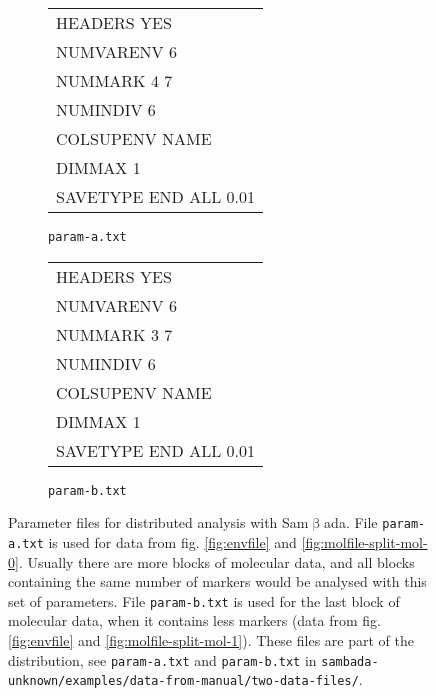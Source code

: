 \documentclass[a4paper,11pt]{article}
\newcommand{\versionnumber}{unknown}
\newcommand{\smb}{\textsf{Sam$\upbeta$ada}}
\newcommand{\pathtodatafrommanual}{\texttt{sambada-\versionnumber/examples/data-from-manual/}}
\newcommand{\pathtotwodatafiles}{\pathtodatafrommanual\texttt{two-data-files/}}
\begin{document}
\begin{figure}[htbp]
\centering

\hfill%
\begin{subfigure}{6cm}
\centering
\ttfamily
\begin{tabular}{|l|}
\hline
HEADERS YES\\	
NUMVARENV 6\\	
NUMMARK 4 7	\\
NUMINDIV 6\\
COLSUPENV NAME\\
DIMMAX 1\\
SAVETYPE END ALL 0.01\\
\hline
\end{tabular}%
\caption{\texttt{param-a.txt}}
\label{fig:fichier-param-parallele-a}
\end{subfigure}%
\hfill%
\begin{subfigure}{6cm}
\centering
\ttfamily
\begin{tabular}{|l|}
\hline
HEADERS YES\\	
NUMVARENV 6\\	
NUMMARK 3 7	\\
NUMINDIV 6\\
COLSUPENV NAME\\
DIMMAX 1\\
SAVETYPE END ALL 0.01\\
\hline
\end{tabular}%
\caption{\texttt{param-b.txt}}
\label{fig:fichier-param-parallele-b}
\end{subfigure}%
\hfill

\caption[Exemple de fichier de paramètres pour \smb.]
{
	Parameter files for distributed analysis with \smb.
	File \texttt{param-a.txt} is used for data from fig. \ref{fig:envfile} and \ref{fig:molfile-split-mol-0}.
	Usually there are more blocks of molecular data, and all blocks containing the same number of markers would be analysed with this set of parameters.
	File \texttt{param-b.txt} is used for the last block of molecular data, when it contains less markers (data from fig. \ref{fig:envfile} and \ref{fig:molfile-split-mol-1}).
	These files are part of the distribution, see \texttt{param-a.txt} and \texttt{param-b.txt} in \pathtotwodatafiles.
}
\label{fig:fichier-param-parallele}
\end{figure}
\end{document}

